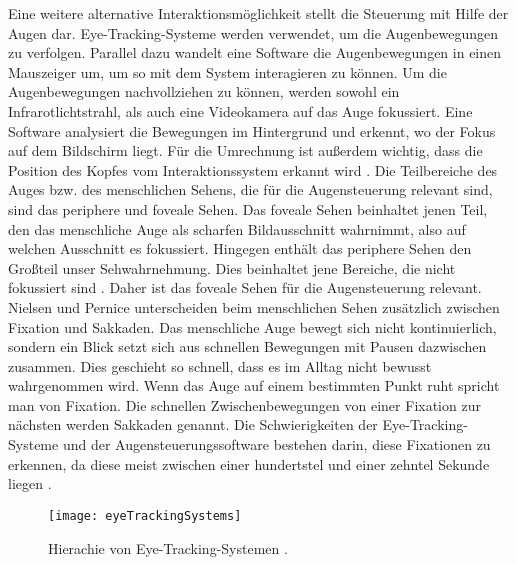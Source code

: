 Eine weitere alternative Interaktionsmöglichkeit stellt die Steuerung mit Hilfe der Augen dar. Eye-Tracking-Systeme werden verwendet, um die Augenbewegungen zu verfolgen. Parallel dazu wandelt eine Software die Augenbewegungen in einen Mauszeiger um, um so mit dem System interagieren zu können. 
\newline \newline
Um die Augenbewegungen nachvollziehen zu können, werden sowohl ein Infrarotlichtstrahl, als auch eine Videokamera auf das Auge fokussiert. Eine Software analysiert die Bewegungen im Hintergrund und erkennt, wo der Fokus auf dem Bildschirm liegt. Für die Umrechnung ist außerdem wichtig, dass die Position des Kopfes vom Interaktionssystem erkannt wird \cite{NielsenPernice}.
\newline \newline
Die Teilbereiche des Auges bzw. des menschlichen Sehens, die für die Augensteuerung relevant sind, sind das periphere und foveale Sehen. Das foveale Sehen beinhaltet jenen Teil, den das menschliche Auge als scharfen Bildausschnitt wahrnimmt, also auf welchen Ausschnitt es fokussiert. Hingegen enthält das periphere Sehen den Großteil unser Sehwahrnehmung. Dies beinhaltet jene Bereiche, die nicht fokussiert sind \cite{NielsenPernice}. Daher ist das foveale Sehen für die Augensteuerung relevant.
\newline \newline
Nielsen und Pernice \cite{NielsenPernice} unterscheiden beim menschlichen Sehen zusätzlich zwischen Fixation und Sakkaden. Das menschliche Auge bewegt sich nicht kontinuierlich, sondern ein Blick setzt sich aus schnellen Bewegungen mit Pausen dazwischen zusammen. Dies geschieht so schnell, dass es im Alltag nicht bewusst wahrgenommen wird. Wenn das Auge auf einem bestimmten Punkt ruht spricht man von Fixation. Die schnellen Zwischenbewegungen von einer Fixation zur nächsten werden Sakkaden genannt. Die Schwierigkeiten der Eye-Tracking-Systeme und der Augensteuerungssoftware bestehen darin, diese Fixationen zu erkennen, da diese meist zwischen einer hundertstel und einer zehntel Sekunde liegen \cite{NielsenPernice}.
\begin{figure}
\centering
\texttt{[image: eyeTrackingSystems]}
\caption{Hierachie von Eye-Tracking-Systemen \cite{Duchowski}.}
\label{fig:eyeTrackingSystems}
\end{figure}
\newline \newline \newline
